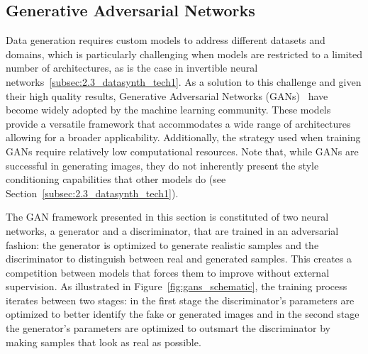 \subsection{Generative Adversarial Networks}
\label{subsec:2.3_datasynth_tech2}

Data generation requires custom models to address different datasets and domains, which is particularly challenging when models are restricted to a limited number of architectures, as is the case in invertible neural networks~\ref{subsec:2.3_datasynth_tech1}. As a solution to this challenge and given their high quality results, Generative Adversarial Networks (GANs)~\citep{2014_NeurIPS_GAN} have become widely adopted by the machine learning community. These models provide a versatile framework that accommodates a wide range of  architectures allowing for a broader applicability. Additionally, the strategy used when training GANs require relatively low computational resources. Note that, while GANs are successful in generating images, they do not inherently present the style conditioning capabilities that other models do (see Section~\ref{subsec:2.3_datasynth_tech1}).

The GAN framework presented in this section is constituted of two neural networks, a generator and a discriminator, that are trained in an adversarial fashion: the generator is optimized to generate realistic samples and the discriminator to distinguish between real and generated samples. This creates a competition between models that forces them to improve without external supervision. As illustrated in Figure~\ref{fig:gans_schematic}, the training process iterates between two stages: in the first stage the discriminator's parameters are optimized to better identify the fake or generated images and in the second stage the generator's parameters are optimized to outsmart the discriminator by making samples that look as real as possible.  

